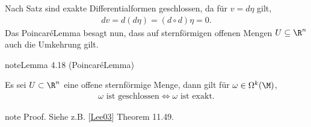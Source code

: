 \documentclass[letterpaper,10pt,german]{jupyterBook}
\begin{document}
\sphinxAtStartPar
Nach Satz  sind exakte Differentialformen geschlossen, da für \(v=d\eta\) gilt,
\begin{equation*}
\begin{split}dv = d(d\eta) = (d\circ d)\eta = 0.\end{split}
\end{equation*}
\sphinxAtStartPar
Das Poincaré\sphinxhyphen{}Lemma besagt nun, dass auf sternförmigen offenen Mengen \(U\subseteq \R^n\) auch die Umkehrung gilt.
\label{manifolds/diffformen:lemma-11}
\begin{sphinxadmonition}{note}{Lemma 4.18 (Poincaré\sphinxhyphen{}Lemma)}



\sphinxAtStartPar
Es sei \(U\subset\R^n\) eine offene sternförmige Menge, dann gilt für \(\omega\in \Omega^k(\M)\),
\begin{equation*}
\begin{split}\omega\text{ ist geschlossen}\Leftrightarrow \omega\text{ ist exakt.}\end{split}
\end{equation*}\end{sphinxadmonition}

\begin{sphinxadmonition}{note}
\sphinxAtStartPar
Proof. Siehe z.B. {[}\hyperlink{cite.references:id18}{Lee03}{]} Theorem 11.49.
\end{sphinxadmonition}
\end{document}
